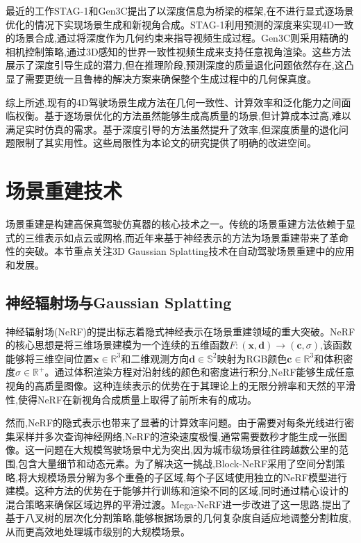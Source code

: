 最近的工作STAG-1\cite{wang2024stag1}和Gen3C\cite{ren2025gen3c}提出了以深度信息为桥梁的框架,在不进行显式逐场景优化的情况下实现场景生成和新视角合成。STAG-1利用预测的深度来实现4D一致的场景合成,通过将深度作为几何约束来指导视频生成过程。Gen3C则采用精确的相机控制策略,通过3D感知的世界一致性视频生成来支持任意视角渲染。这些方法展示了深度引导生成的潜力,但在推理阶段,预测深度的质量退化问题依然存在,这凸显了需要更统一且鲁棒的解决方案来确保整个生成过程中的几何保真度。

综上所述,现有的4D驾驶场景生成方法在几何一致性、计算效率和泛化能力之间面临权衡。基于逐场景优化的方法虽然能够生成高质量的场景,但计算成本过高,难以满足实时仿真的需求。基于深度引导的方法虽然提升了效率,但深度质量的退化问题限制了其实用性。这些局限性为本论文的研究提供了明确的改进空间。

\section{场景重建技术}

场景重建是构建高保真驾驶仿真器的核心技术之一。传统的场景重建方法依赖于显式的三维表示如点云或网格,而近年来基于神经表示的方法为场景重建带来了革命性的突破。本节重点关注3D Gaussian Splatting技术在自动驾驶场景重建中的应用和发展。

\subsection{神经辐射场与Gaussian Splatting}

神经辐射场(NeRF)的提出标志着隐式神经表示在场景重建领域的重大突破\cite{mildenhall2021nerf}。NeRF的核心思想是将三维场景建模为一个连续的五维函数$F: (\mathbf{x}, \mathbf{d}) \rightarrow (\mathbf{c}, \sigma)$,该函数能够将三维空间位置$\mathbf{x} \in \mathbb{R}^3$和二维观测方向$\mathbf{d} \in \mathbb{S}^2$映射为RGB颜色$\mathbf{c} \in \mathbb{R}^3$和体积密度$\sigma \in \mathbb{R}^+$。通过体积渲染方程对沿射线的颜色和密度进行积分,NeRF能够生成任意视角的高质量图像。这种连续表示的优势在于其理论上的无限分辨率和天然的平滑性,使得NeRF在新视角合成质量上取得了前所未有的成功。

然而,NeRF的隐式表示也带来了显著的计算效率问题。由于需要对每条光线进行密集采样并多次查询神经网络,NeRF的渲染速度极慢,通常需要数秒才能生成一张图像。这一问题在大规模驾驶场景中尤为突出,因为城市级场景往往跨越数公里的范围,包含大量细节和动态元素。为了解决这一挑战,Block-NeRF采用了空间分割策略\cite{blocknerf2022},将大规模场景分解为多个重叠的子区域,每个子区域使用独立的NeRF模型进行建模。这种方法的优势在于能够并行训练和渲染不同的区域,同时通过精心设计的混合策略来确保区域边界的平滑过渡。Mega-NeRF\cite{meganeRF2022}进一步改进了这一思路,提出了基于八叉树的层次化分割策略,能够根据场景的几何复杂度自适应地调整分割粒度,从而更高效地处理城市级别的大规模场景。

